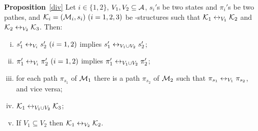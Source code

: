 \documentclass{article}
\begin{document}
\textbf{Proposition}~\ref{div}
Let $i\in \{1,2\}$, $V_1,V_2\subseteq\cal A$, $s_i'$s be two states and
  $\pi_i'$s be two pathes,
and ${\cal K}_i=({\cal M}_i,s_i)~(i=1,2,3)$ be \MPK-structures
 such that
${\cal K}_1\leftrightarrow_{V_1}{\cal K}_2$ and ${\cal K}_2\leftrightarrow_{V_2}{\cal K}_3$.
 Then:
 \begin{enumerate}[(i)]
   \item $s_1'\leftrightarrow_{V_i}s_2'~(i=1,2)$ implies $s_1'\leftrightarrow_{V_1\cup V_2}s_2'$;
   \item $\pi_1'\leftrightarrow_{V_i}\pi_2'~(i=1,2)$ implies $\pi_1'\leftrightarrow_{V_1\cup V_2}\pi_2'$;
   \item for each path $\pi_{s_1}$ of ${\cal M}_1$ there is a path $\pi_{s_2}$  of ${\cal M}_2$ such that $\pi_{s_1} \leftrightarrow_{V_1} \pi_{s_2}$, and vice versa;
   \item ${\cal K}_1\leftrightarrow_{V_1\cup V_2}{\cal K}_3$;
   \item If $V_1 \subseteq V_2$ then ${\cal K}_1 \leftrightarrow_{V_2} {\cal K}_2$.
 \end{enumerate}
\end{document}

